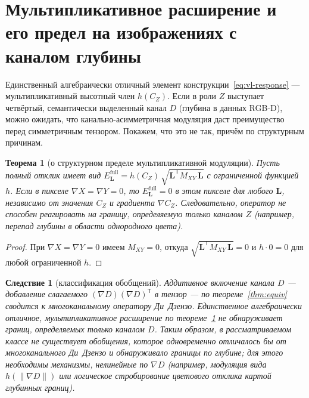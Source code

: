 \documentclass[11pt,a4paper]{article}
\theoremstyle{plain}
\newtheorem{theorem}{Теорема}
\newtheorem{corollary}{Следствие}
\theoremstyle{definition}
\theoremstyle{remark}
\newcommand{\Lvec}{\mathbf{L}}
\newcommand{\grad}{\nabla}
\newcommand{\Mxy}{M_{XY}}
\newcommand{\T}{^{\mathsf T}}
\begin{document}
\section{Мультипликативное расширение и его предел на изображениях
с каналом глубины}
\label{sec:rgbd}

Единственный алгебраически отличный элемент
конструкции~\eqref{eq:vl-response} --- мультипликативный высотный член
$h(C_Z)$. Если в роли $Z$ выступает четвёртый, семантически выделенный канал
$D$ (глубина в данных RGB-D), можно ожидать, что канально-асимметричная
модуляция даст преимущество перед симметричным тензором. Покажем, что это
не так, причём по структурным причинам.

\begin{theorem}[о структурном пределе мультипликативной модуляции]
\label{thm:mult}
Пусть полный отклик имеет вид
$E_{\Lvec}^{\mathrm{full}} = h(C_Z)\,\sqrt{\Lvec\T \Mxy\, \Lvec}$
с ограниченной функцией $h$. Если в пикселе $\grad X = \grad Y = 0$, то
$E_{\Lvec}^{\mathrm{full}} = 0$ в этом пикселе для любого $\Lvec$,
независимо от значения $C_Z$ и градиента $\grad C_Z$. Следовательно,
оператор не способен реагировать на границу, определяемую только каналом
$Z$ (например, перепад глубины в области однородного цвета).
\end{theorem}

\begin{proof}
При $\grad X = \grad Y = 0$ имеем $\Mxy = 0$, откуда
$\sqrt{\Lvec\T \Mxy\, \Lvec} = 0$ и $h \cdot 0 = 0$ для любой ограниченной
$h$.
\end{proof}

\begin{corollary}[классификация обобщений]
\label{cor:map}
\emph{Аддитивное} включение канала $D$ --- добавление слагаемого
$(\grad D)(\grad D)\T$ в тензор --- по теореме~\ref{thm:equiv} сводится к
многоканальному оператору Ди~Дзензо. Единственное алгебраически отличное,
\emph{мультипликативное} расширение по теореме~\ref{thm:mult} не
обнаруживает границ, определяемых только каналом $D$. Таким образом, в
рассматриваемом классе не существует обобщения, которое одновременно
отличалось бы от многоканального Ди~Дзензо и обнаруживало границы по
глубине; для этого необходимы механизмы, нелинейные по $\grad D$
(например, модуляция вида $h(\|\grad D\|)$ или логическое стробирование
цветового отклика картой глубинных границ).
\end{corollary}
\end{document}
